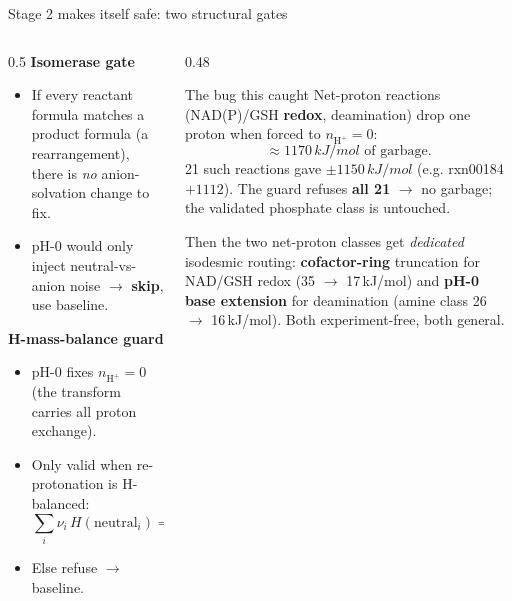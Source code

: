 \documentclass[aspectratio=169,11pt]{beamer}
\newcommand{\kj}{\,kJ/mol}
\newcommand{\arw}{$\rightarrow$}
\begin{document}
\begin{frame}{Stage 2 makes itself safe: two structural gates}
  \begin{columns}[T]
    \begin{column}{0.5\textwidth}
      \textbf{Isomerase gate}
      \begin{itemize}\footnotesize
        \item If every reactant formula matches a product formula (a rearrangement), there is
        \emph{no} anion-solvation change to fix.
        \item pH-0 would only inject neutral-vs-anion noise \arw{} \textbf{skip}, use baseline.
      \end{itemize}
      \vspace{0.6em}
      \textbf{H-mass-balance guard}
      \begin{itemize}\footnotesize
        \item pH-0 fixes $n_{\mathrm{H^+}}{=}0$ (the transform carries all proton exchange).
        \item Only valid when re-protonation is H-balanced:
        \[ \textstyle\sum_i \nu_i\, H(\text{neutral}_i) = 0. \]
        \item Else refuse \arw{} baseline.
      \end{itemize}
    \end{column}
    \begin{column}{0.48\textwidth}
      \begin{alertblock}{The bug this caught}
        \footnotesize Net-proton reactions (NAD(P)/GSH \textbf{redox}, deamination) drop one
        proton when forced to $n_{\mathrm{H^+}}{=}0$:
        \[ \approx 1170\kj \text{ of garbage.} \]
        21 such reactions gave $\pm1150\kj$ (e.g. rxn00184 $+1112$).
        The guard refuses \textbf{all 21} \arw{} no garbage; the validated phosphate class is untouched.
      \end{alertblock}
      {\scriptsize Then the two net-proton classes get \emph{dedicated} isodesmic routing:
      \textbf{cofactor-ring} truncation for NAD/GSH redox (35 \arw{} 17\kj) and \textbf{pH-0 base
      extension} for deamination (amine class 26 \arw{} 16\kj). Both experiment-free, both general.}
    \end{column}
  \end{columns}
\end{frame}
\end{document}
